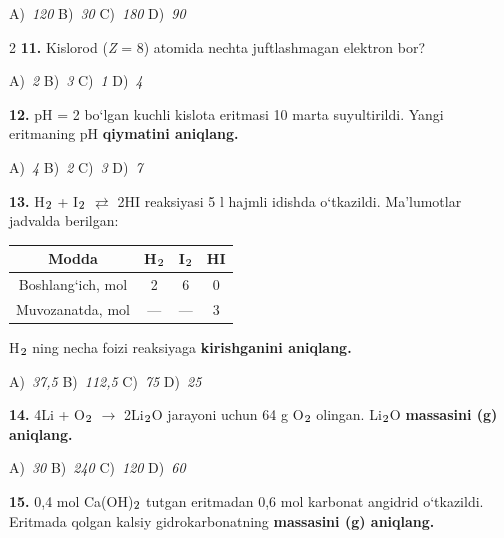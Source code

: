\documentclass[11pt,a4paper]{article}
\renewcommand{\textsubscript}[1]{\ensuremath{_{\text{\fontsize{8}{8}\selectfont #1}}}}
\begin{document}
\noindent A)~\textsl{120} \hfill B)~\textsl{30} \hfill C)~\textsl{180} \hfill D)~\textsl{90}\par
\vspace{4pt}
\begin{multicols}{2}
\noindent\textbf{11.} Kislorod (\textit{Z} = 8) atomida nechta juftlashmagan elektron bor?

\noindent A)~\textsl{2} \hfill B)~\textsl{3} \hfill C)~\textsl{1} \hfill D)~\textsl{4}\par
\vspace{4pt}
\noindent\textbf{12.} pH = 2 bo`lgan kuchli kislota eritmasi 10 marta suyultirildi. Yangi eritmaning pH \textbf{qiymatini aniqlang.}

\noindent A)~\textsl{4} \hfill B)~\textsl{2} \hfill C)~\textsl{3} \hfill D)~\textsl{7}\par
\vspace{4pt}
\noindent\textbf{13.} H\textsubscript{2} + I\textsubscript{2} $\rightleftarrows$ 2HI reaksiyasi 5 l hajmli idishda o`tkazildi. Ma'lumotlar jadvalda berilgan:
\begin{center}
\renewcommand{\arraystretch}{1.15}
\begin{tabular}{|c|c|c|c|}\hline
\textbf{Modda} & \textbf{H\textsubscript{2}} & \textbf{I\textsubscript{2}} & \textbf{HI} \\ \hline
Boshlang`ich, mol & 2 & 6 & 0 \\ \hline
Muvozanatda, mol & --- & --- & 3 \\ \hline
\end{tabular}
\end{center}
H\textsubscript{2} ning necha foizi reaksiyaga \textbf{kirishganini aniqlang.}

\noindent A)~\textsl{37,5} \hfill B)~\textsl{112,5} \hfill C)~\textsl{75} \hfill D)~\textsl{25}\par
\vspace{4pt}
\noindent\textbf{14.} 4Li + O\textsubscript{2} $\to$ 2Li\textsubscript{2}O jarayoni uchun 64 g O\textsubscript{2} olingan. Li\textsubscript{2}O \textbf{massasini (g) aniqlang.}

\noindent A)~\textsl{30} \hfill B)~\textsl{240} \hfill C)~\textsl{120} \hfill D)~\textsl{60}\par
\vspace{4pt}
\noindent\textbf{15.} 0,4 mol Ca(OH)\textsubscript{2} tutgan eritmadan 0,6 mol karbonat angidrid o`tkazildi. Eritmada qolgan kalsiy gidrokarbonatning \textbf{massasini (g) aniqlang.}


\end{multicols}
\end{document}
